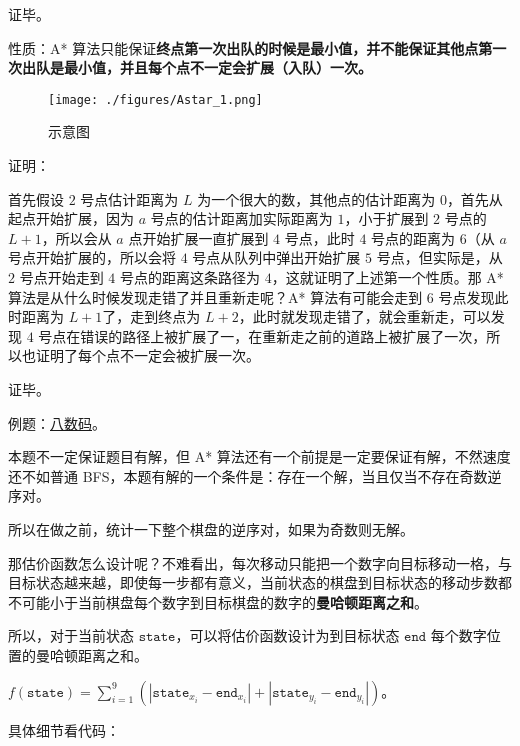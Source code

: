 证毕。

性质：A* 算法只能保证\textbf{终点第一次出队的时候是最小值，并不能保证其他点第一次出队是最小值，并且每个点不一定会扩展（入队）一次。}

\begin{figure}[ht]
\centering
\texttt{[image: ./figures/Astar\_1.png]}
\caption{示意图} \label{Astar_fig1}
\end{figure}

证明：

首先假设 $2$ 号点估计距离为 $L$ 为一个很大的数，其他点的估计距离为 $0$，首先从起点开始扩展，因为 $a$ 号点的估计距离加实际距离为 $1$，小于扩展到 $2$ 号点的 $L + 1$，所以会从 $a$ 点开始扩展一直扩展到 $4$ 号点，此时 $4$ 号点的距离为 $6$（从 $a$ 号点开始扩展的，所以会将 $4$ 号点从队列中弹出开始扩展 $5$ 号点，但实际是，从 $2$ 号点开始走到 $4$ 号点的距离这条路径为 $4$，这就证明了上述第一个性质。那 A* 算法是从什么时候发现走错了并且重新走呢？A* 算法有可能会走到 $6$ 号点发现此时距离为 $L + 1$了，走到终点为 $L + 2$，此时就发现走错了，就会重新走，可以发现 $4$ 号点在错误的路径上被扩展了一，在重新走之前的道路上被扩展了一次，所以也证明了每个点不一定会被扩展一次。 

证毕。

例题：\href{http://poj.org/problem?id=1077}{八数码}。

本题不一定保证题目有解，但 A* 算法还有一个前提是一定要保证有解，不然速度还不如普通 BFS，本题有解的一个条件是：存在一个解，当且仅当不存在奇数逆序对。

所以在做之前，统计一下整个棋盘的逆序对，如果为奇数则无解。

那估价函数怎么设计呢？不难看出，每次移动只能把一个数字向目标移动一格，与目标状态越来越，即使每一步都有意义，当前状态的棋盘到目标状态的移动步数都不可能小于当前棋盘每个数字到目标棋盘的数字的\textbf{曼哈顿距离之和}。

所以，对于当前状态 $\texttt{state}$，可以将估价函数设计为到目标状态 $\texttt{end}$ 每个数字位置的曼哈顿距离之和。

$f(\texttt{state}) = \sum^9_{i = 1}(|\texttt{state}_{x_{i}} - \texttt{end}_{x_{i}}| + |\texttt{state}_{y_{i}} - \texttt{end}_{y_{i}}|)$。

具体细节看代码：

